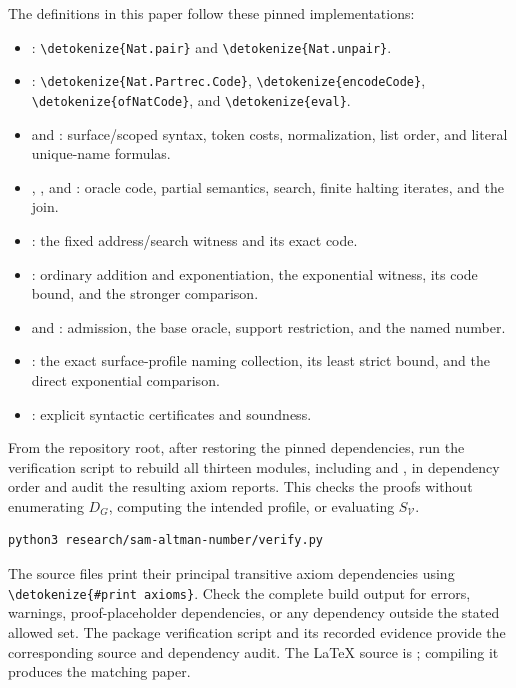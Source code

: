 \documentclass[11pt]{article}
\newcommand{\V}{\mathcal V}
\newcommand{\code}[1]{{\small\expandafter\nolinkurl\expandafter{\detokenize{#1}}}}
\begin{document}
The definitions in this paper follow these pinned implementations:
\begin{itemize}
\item {}: \code{Nat.pair} and
  \code{Nat.unpair}.
\item {}:
  \code{Nat.Partrec.Code}, \code{encodeCode}, \code{ofNatCode}, and \code{eval}.
\item {} and :
  surface/scoped syntax, token costs, normalization, list order, and literal
  unique-name formulas.
\item {}, , and
  : oracle code, partial semantics, search,
  finite halting iterates, and the join.
\item {}: the fixed address/search witness and its exact code.
\item {}: ordinary addition and exponentiation,
  the exponential witness, its code bound, and the stronger comparison.
\item {} and :
  admission, the base oracle, support restriction, and the named number.
\item {}: the exact surface-profile naming
  collection, its least strict bound, and the direct exponential comparison.
\item {}: explicit syntactic certificates and soundness.
\end{itemize}

From the repository root, after restoring the pinned dependencies, run the
verification script to rebuild all thirteen modules, including
 and , in dependency order and audit the resulting
axiom reports. This checks the proofs without enumerating $D_G$, computing
the intended profile, or evaluating $S_{\V}$.

\begin{Verbatim}[fontsize=\footnotesize]
python3 research/sam-altman-number/verify.py
\end{Verbatim}

The source files print their principal transitive axiom dependencies using
\code{#print axioms}. Check the complete build output for errors, warnings,
proof-placeholder dependencies, or any dependency outside the stated allowed
set. The package verification script and its recorded evidence provide the
corresponding source and dependency audit. The LaTeX source is
; compiling it produces the matching paper.
\end{document}
